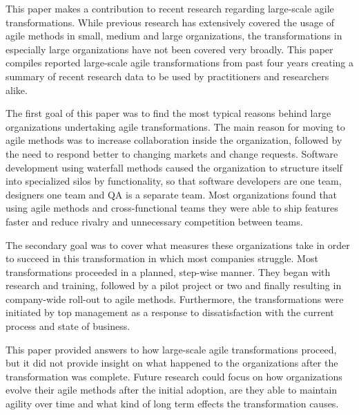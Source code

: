 This paper makes a contribution to recent research regarding large-scale
agile transformations. While previous research has extensively covered
the usage of agile methods in small, medium and large organizations,
the transformations in especially large organizations have not been
covered very broadly. This paper compiles reported large-scale agile
transformations from past four years creating a summary of recent
research data to be used by practitioners and researchers alike.

The first goal of this paper was to find the most typical reasons behind
large organizations undertaking agile transformations. The main reason
for moving to agile methods was to increase collaboration inside the
organization, followed by the need to respond better to changing markets
and change requests. Software development using waterfall methods
caused the organization to structure itself into specialized silos by
functionality, so that software developers are one team, designers one
team and QA is a separate team. Most organizations found that using
agile methods and cross-functional teams they were able to ship features
faster and reduce rivalry and unnecessary competition between teams.

The secondary goal was to cover what measures these organizations take
in order to succeed in this transformation in which most companies
struggle. Most transformations proceeded in a planned, step-wise manner.
They began with research and training, followed by a pilot project or
two and finally resulting in company-wide roll-out to agile methods.
Furthermore, the transformations were initiated by top management as
a response to dissatisfaction with the current process and state of
business.

This paper provided answers to how large-scale agile transformations
proceed, but it did not provide insight on what happened to the
organizations after the transformation was complete. Future research
could focus on how organizations evolve their agile methods after the
initial adoption, are they able to maintain agility over time and what
kind of long term effects the transformation causes.
